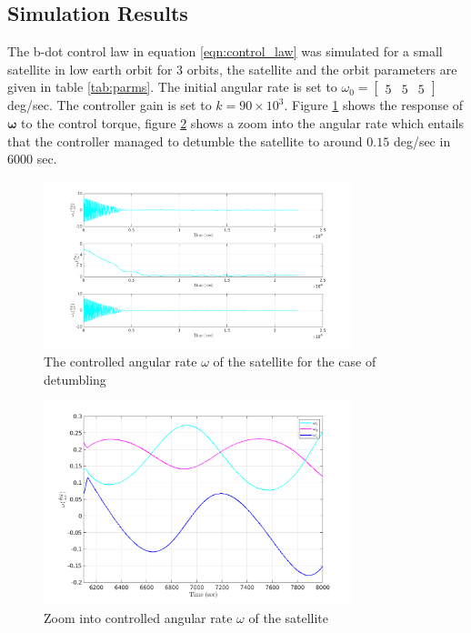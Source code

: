 \subsection{Simulation Results} \label{sec:sim_res}
The b-dot control law in equation \ref{eqn:control_law} was simulated for a small satellite in low earth orbit for 3 orbits, the satellite and the orbit parameters are given in table \ref{tab:parms}. The initial angular rate is set to $\omega_0 = \begin{bmatrix} 5 & 5 & 5 \end{bmatrix}$ deg/sec. The controller gain is set to $k = 90 \times 10^3$. Figure \ref{fig:omega_cont} shows the response of $\boldsymbol{\omega}$ to the control torque, figure \ref{fig:omega_zoom} shows a zoom into the angular rate which entails that the controller managed to detumble the satellite to around $0.15$ deg/sec in 6000 sec. 
\begin{figure}[H]
    \centering
    \includegraphics[width=0.8\textwidth]{Figures/omega_x_y_z.png}
    \caption{The controlled angular rate $\omega$ of the satellite for the case of detumbling}
    \label{fig:omega_cont}
\end{figure}
\begin{figure}[H]
    \centering
    \includegraphics[width=0.8\textwidth]{Figures/zoom.png}
    \caption{Zoom into controlled angular rate $\omega$ of the satellite}
    \label{fig:omega_zoom}
\end{figure}
